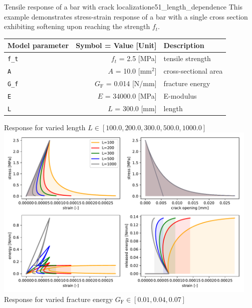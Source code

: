 \documentclass[main.tex]{subfiles}
\begin{document}
\begin{bmcsex}{Tensile response of a bar with crack localization}{e51_length_dependence}
\noindent This example demonstrates stress-strain response 
    of a bar with a single cross section exhibiting softening upon
    reaching the strength $f_t$.
 \\
\begin{center}
            
{\scriptsize 
\begin{longtable}{lrp{4cm}}\toprule
\textbf{\textsf{Model parameter}} 
& 
\textbf{\textsf{Symbol = Value [Unit]}} 
&
\textbf{\textsf{Description}}  \\\midrule \midrule
\texttt{f\_t} & $f_t$ = 2.5 [MPa] & {\footnotesize tensile strength}  \\
            \texttt{A} & $A$ = 10.0 [$\mathrm{mm}^2$] & {\footnotesize cross-sectional area}  \\
            \texttt{G\_f} & $G_\mathrm{F}$ = 0.014 [N/mm] & {\footnotesize fracture energy}  \\
            \texttt{E} & $E$ = 34000.0 [MPa] & {\footnotesize E-modulus}  \\
            \texttt{L} & $L$ = 300.0 [mm] & {\footnotesize length}  \\
            \bottomrule 
\end{longtable}
}
\begin{center}
Response for varied length $L \in [100.0, 200.0, 300.0, 500.0, 1000.0]$\\
        \includegraphics[width=0.95\textwidth]{examples/e51_length_dependence/fig_length_dependence.pdf}\\
    Response for varied fracture energy $G_\mathrm{F} \in [0.01, 0.04, 0.07]$\\

\end{center}
\end{center}
\end{bmcsex}
\end{document}

